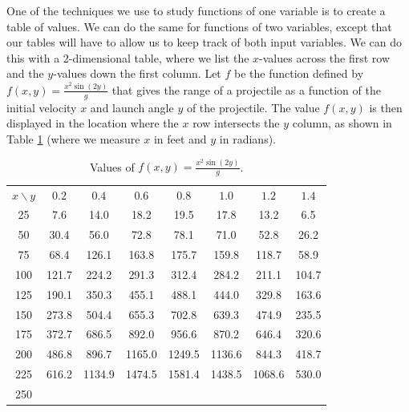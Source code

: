 One of the techniques we use to study functions of one
variable is to create a table of values. We can do the same for
functions of two variables, except that our tables will have to allow
us to keep track of both input variables. We can do this with a
2-dimensional table, where we list the $x$-values across the first row 
and the $y$-values down the first column. Let $f$ be the function
defined by $f(x,y) = \frac{x^2 \sin(2y)}{g}$ that gives the range of a
projectile as a function of the initial velocity $x$ and launch angle
$y$ of the projectile. The value $f(x,y)$ is then displayed in the
location where the $x$ row intersects the $y$ column, as shown in
Table \ref{T:9.1.range} (where we measure $x$ in feet and $y$ in
radians).

\begin{table}[ht]
\begin{center}
\begin{tabular}{|c|c|c|c|c|c|c|c|} \hline
$x\backslash y$   &$0.2$ 	&$0.4$ 	&$0.6$ 	&$0.8$ 	&$1.0$ 	&$1.2$ &$1.4$      \\ \hhline{|=|=|=|=|=|=|=|=|}
25       &7.6		&14.0	&18.2	&19.5	&17.8	&13.2	&6.5      \\ \hline
50       &30.4		&56.0	&72.8	&78.1	&71.0	&52.8	&26.2     \\ \hline
75       &68.4		&126.1	&163.8	&175.7	&159.8	&118.7	&58.9   \\ \hline
100      &121.7	&224.2	&291.3	&312.4	&284.2	&211.1	&104.7    \\ \hline
125      &190.1	&350.3	&455.1	&488.1	&444.0	&329.8	&163.6    \\ \hline
150      &273.8	&504.4	&655.3	&702.8	&639.3	&474.9	&235.5    \\ \hline
175      &372.7	&686.5	&892.0	&956.6	&870.2	&646.4	&320.6    \\ \hline
200      &486.8	&896.7	&1165.0	&1249.5	&1136.6	&844.3	&418.7    \\ \hline
225      &616.2	&1134.9	&1474.5	&1581.4	&1438.5	&1068.6	&530.0   \\ \hline
250      &           &           &           &           &           &           &                  \\ \hline
\end{tabular}
\caption{Values of $f(x,y) = \frac{x^2 \sin(2y)}{g}$.}
\label{T:9.1.range}
\end{center}
\end{table}

